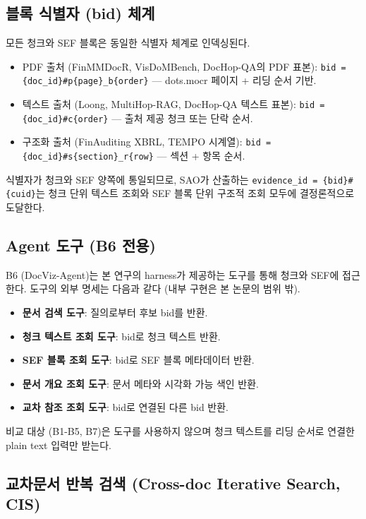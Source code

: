 \documentclass[11pt]{article}
\begin{document}
\subsection{블록 식별자 (bid) 체계}
\label{sec:bid-scheme}

모든 청크와 SEF 블록은 동일한 식별자 체계로 인덱싱된다.

\begin{itemize}[leftmargin=*]
    \item PDF 출처 (FinMMDocR, VisDoMBench, DocHop-QA의 PDF 표본): \texttt{bid = \{doc\_id\}\#p\{page\}\_b\{order\}} — dots.mocr 페이지 + 리딩 순서 기반.
    \item 텍스트 출처 (Loong, MultiHop-RAG, DocHop-QA 텍스트 표본): \texttt{bid = \{doc\_id\}\#c\{order\}} — 출처 제공 청크 또는 단락 순서.
    \item 구조화 출처 (FinAuditing XBRL, TEMPO 시계열): \texttt{bid = \{doc\_id\}\#s\{section\}\_r\{row\}} — 섹션 + 항목 순서.
\end{itemize}

식별자가 청크와 SEF 양쪽에 통일되므로, SAO가 산출하는 \texttt{evidence\_id = \{bid\}\#\{cuid\}}는 청크 단위 텍스트 조회와 SEF 블록 단위 구조적 조회 모두에 결정론적으로 도달한다.

\subsection{Agent 도구 (B6 전용)}

B6 (DocViz-Agent)는 본 연구의 harness가 제공하는 도구를 통해 청크와 SEF에 접근한다. 도구의 외부 명세는 다음과 같다 (내부 구현은 본 논문의 범위 밖).

\begin{itemize}[leftmargin=*]
    \item \textbf{문서 검색 도구}: 질의로부터 후보 bid를 반환.
    \item \textbf{청크 텍스트 조회 도구}: bid로 청크 텍스트 반환.
    \item \textbf{SEF 블록 조회 도구}: bid로 SEF 블록 메타데이터 반환.
    \item \textbf{문서 개요 조회 도구}: 문서 메타와 시각화 가능 색인 반환.
    \item \textbf{교차 참조 조회 도구}: bid로 연결된 다른 bid 반환.
\end{itemize}

비교 대상 (B1-B5, B7)은 도구를 사용하지 않으며 청크 텍스트를 리딩 순서로 연결한 plain text 입력만 받는다.

\subsection{교차문서 반복 검색 (Cross-doc Iterative Search, CIS)}
\end{document}
